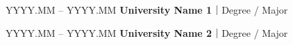 

\begin{twocolentry}{YYYY.MM -- YYYY.MM}
  \textbf{University Name 1}｜Degree / Major
\end{twocolentry}

\begin{twocolentry}{YYYY.MM -- YYYY.MM}
  \textbf{University Name 2}｜Degree / Major
\end{twocolentry}
